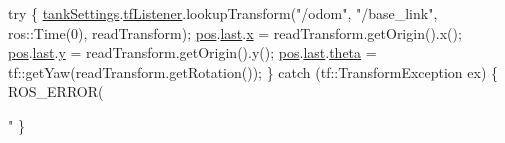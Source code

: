 \begin{DoxyCode}
    \textcolor{keywordflow}{try} \{
        \hyperlink{classTankSteering_a6973af1afc00c9b11f32ecc7ad7e8a14}{tankSettings}.\hyperlink{structTankSteering_1_1tankSet_a2df52ee5bd9169dad2bd8c70d054cf74}{tfListener}.lookupTransform(\textcolor{stringliteral}{"/odom"}, \textcolor{stringliteral}{
      "/base\_link"}, ros::Time(0), readTransform);
        \hyperlink{classTankSteering_ae08d9f507d6de01a86f59aa135283abc}{pos}.\hyperlink{structTankSteering_1_1odom_ae6353ef712a0b7bc9c783d77229d2221}{last}.\hyperlink{structTankSteering_1_1orientation_af121cb548f0f9fcfc8a294654b1ceb85}{x} = readTransform.getOrigin().x();
        \hyperlink{classTankSteering_ae08d9f507d6de01a86f59aa135283abc}{pos}.\hyperlink{structTankSteering_1_1odom_ae6353ef712a0b7bc9c783d77229d2221}{last}.\hyperlink{structTankSteering_1_1orientation_a6fa34c399e16ffa4c8b8145126c6c9bf}{y} = readTransform.getOrigin().y();
        \hyperlink{classTankSteering_ae08d9f507d6de01a86f59aa135283abc}{pos}.\hyperlink{structTankSteering_1_1odom_ae6353ef712a0b7bc9c783d77229d2221}{last}.\hyperlink{structTankSteering_1_1orientation_a9e0356a869ea75261e37e089262cc5e8}{theta} = tf::getYaw(readTransform.getRotation());
    \} \textcolor{keywordflow}{catch} (tf::TransformException ex) \{
        ROS\_ERROR(\textcolor{stringliteral}{"%
    \}

}
\end{DoxyCode}
